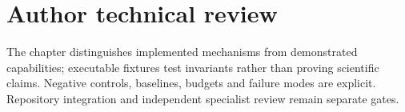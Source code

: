 \chapter*{Author technical review}
The chapter distinguishes implemented mechanisms from demonstrated capabilities; executable fixtures test invariants rather than proving scientific claims. Negative controls, baselines, budgets and failure modes are explicit. Repository integration and independent specialist review remain separate gates.
